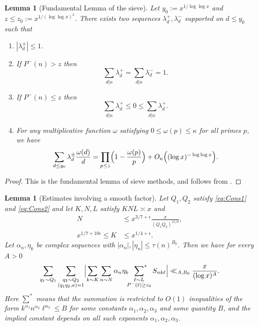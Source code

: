 \documentclass[10pt]{amsart}
\theoremstyle{plain}
\newtheorem{lmm}[thrm]{Lemma}
\numberwithin{equation}{section}
\begin{document}
%
%
%
%
%
%
%
%
\begin{lmm}[Fundamental Lemma of the sieve]\label{lmm:FundamentalLemma}
Let $y_0:=x^{1/\log\log{x}}$ and $z\le z_0:=x^{1/(\log\log{x})^3}$. There exists two sequences $\lambda_d^+,\lambda_d^-$ supported on $d\le y_0$ such that
\begin{enumerate}
\item $|\lambda_d^\pm|\le 1$.
\item If $P^-(n)> z$ then
\[
\sum_{d|n}\lambda^+_d=\sum_{d|n}\lambda_d^-=1.
\]
\item If $P^-(n)\le z$ then
\[
\sum_{d|n}\lambda^+_d\le 0\le \sum_{d|n}\lambda_d^+.
\]
\item For any multiplicative function $\omega$ satisfying $0\le \omega(p)\le \kappa$ for all primes $p$, we have
\[
\sum_{d\le y_0}\lambda_d^\pm\frac{\omega(d)}{d}=\prod_{p\le z}\Bigl(1-\frac{\omega(p)}{p}\Bigr)+O_\kappa\Bigl((\log{x})^{-\log\log{x}}\Bigr).
\]
\end{enumerate}
\end{lmm}
%
%
%
%
\begin{proof}
This is the fundamental lemma of sieve methods, and follows from \cite[Lemma 6.3]{IwaniecKowalski}.
\end{proof}
%
%
%
%
%
%
%
%
\begin{lmm}[Estimates involving a smooth factor]\label{lmm:TypeI}
Let $Q_1,Q_2$ satisfy \eqref{eq:Cons1} and \eqref{eq:Cons2}
 and let $K,N,L$ satisfy $K N L\asymp x$ and
\begin{align*}
N&\le x^{3/7+\epsilon} \frac{x}{(Q_1Q_2)^{15/8}},\\
x^{1/7+10\epsilon}\le K&\le x^{1/4+\epsilon}.
\end{align*}
Let $\alpha_n,\eta_k$ be complex sequences with $|\alpha_n|,|\eta_n|\le \tau(n)^{B_0}$. Then we have for every $A>0$
\[
\sum_{q_1\sim Q_1}\sum_{\substack{q_2\sim Q_2\\ (q_1q_2,a)=1}}\Bigl|\sum_{k\sim K}\sum_{n\sim N}\alpha_n\eta_k \sideset{}{^*}\sum_{\substack{\ell\sim L\\ P^-(\ell)\ge z_0}}S_{n k\ell}\Bigr|\ll_{A,B_0} \frac{x}{(\log{x})^A}.
\]
Here $\sum^*$ means that the summation is restricted to $O(1)$ inequalities of the form $k^{\alpha_1} n^{\alpha_2} \ell^{\alpha_3}\le B$ for some constants $\alpha_1,\alpha_2,\alpha_3$ and some quantity $B$, and the implied constant depends on all such exponents $\alpha_1,\alpha_2,\alpha_3$.
\end{lmm}
\end{document}

